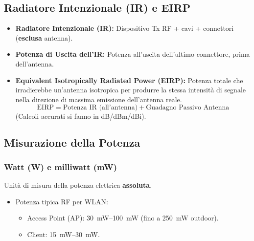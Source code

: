 \subsection{Radiatore Intenzionale (IR) e EIRP}
\begin{itemize}
    \item \textbf{Radiatore Intenzionale (IR):} Dispositivo Tx RF + cavi + connettori (\textbf{esclusa} antenna).
    \item \textbf{Potenza di Uscita dell'IR:} Potenza all'uscita dell'ultimo connettore, prima dell'antenna.
    \item \textbf{Equivalent Isotropically Radiated Power (EIRP):} Potenza totale che irradierebbe un'antenna isotropica per produrre la stessa intensità di segnale nella direzione di massima emissione dell'antenna reale.
    \[ \text{EIRP} = \text{Potenza IR (all'antenna)} + \text{Guadagno Passivo Antenna} \]
    (Calcoli accurati si fanno in dB/dBm/dBi).
\end{itemize}

\subsection{Misurazione della Potenza}
\subsubsection{Watt (W) e milliwatt (mW)}
Unità di misura della potenza elettrica \textbf{assoluta}.
\begin{itemize}
    \item Potenza tipica RF per WLAN:
    \begin{itemize}
        \item Access Point (AP): \SIrange{30}{100}{\milli\watt} (fino a \SI{250}{\milli\watt} outdoor).
        \item Client: \SIrange{15}{30}{\milli\watt}.
    \end{itemize}
\end{itemize}

